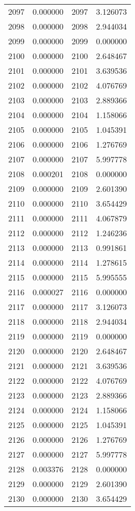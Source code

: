 \documentclass[12pt]{article}
\begin{document}
\begin{longtable}{@{}cccc@{}}
2097 & 0.000000 & 2097 & 3.126073 \\
2098 & 0.000000 & 2098 & 2.944034 \\
2099 & 0.000000 & 2099 & 0.000000 \\
2100 & 0.000000 & 2100 & 2.648467 \\
2101 & 0.000000 & 2101 & 3.639536 \\
2102 & 0.000000 & 2102 & 4.076769 \\
2103 & 0.000000 & 2103 & 2.889366 \\
2104 & 0.000000 & 2104 & 1.158066 \\
2105 & 0.000000 & 2105 & 1.045391 \\
2106 & 0.000000 & 2106 & 1.276769 \\
2107 & 0.000000 & 2107 & 5.997778 \\
2108 & 0.000201 & 2108 & 0.000000 \\
2109 & 0.000000 & 2109 & 2.601390 \\
2110 & 0.000000 & 2110 & 3.654429 \\
2111 & 0.000000 & 2111 & 4.067879 \\
2112 & 0.000000 & 2112 & 1.246236 \\
2113 & 0.000000 & 2113 & 0.991861 \\
2114 & 0.000000 & 2114 & 1.278615 \\
2115 & 0.000000 & 2115 & 5.995555 \\
2116 & 0.000027 & 2116 & 0.000000 \\
2117 & 0.000000 & 2117 & 3.126073 \\
2118 & 0.000000 & 2118 & 2.944034 \\
2119 & 0.000000 & 2119 & 0.000000 \\
2120 & 0.000000 & 2120 & 2.648467 \\
2121 & 0.000000 & 2121 & 3.639536 \\
2122 & 0.000000 & 2122 & 4.076769 \\
2123 & 0.000000 & 2123 & 2.889366 \\
2124 & 0.000000 & 2124 & 1.158066 \\
2125 & 0.000000 & 2125 & 1.045391 \\
2126 & 0.000000 & 2126 & 1.276769 \\
2127 & 0.000000 & 2127 & 5.997778 \\
2128 & 0.003376 & 2128 & 0.000000 \\
2129 & 0.000000 & 2129 & 2.601390 \\
2130 & 0.000000 & 2130 & 3.654429 \\

\end{longtable}
\end{document}
